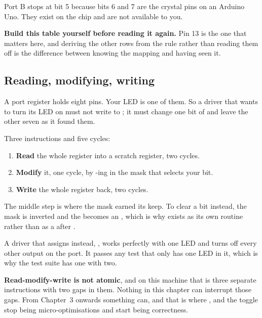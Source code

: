 Port B stops at bit 5 because bits 6 and 7 are the crystal pins on an Arduino Uno. They exist on
the chip and are not available to you.

\textbf{Build this table yourself before reading it again.} Pin 13 is the one that matters here,
and deriving the other rows from the rule rather than reading them off is the difference between
knowing the mapping and having seen it.

\subsection{Reading, modifying, writing}
\label{c2:sec:rmw}
A port register holds eight pins. Your LED is one of them. So a driver that wants to turn its LED
on must not write to ; it must change one bit of  and leave the other seven
as it found them.

Three instructions and five cycles:
\begin{enumerate}
  \item \textbf{Read} the whole register into a scratch register, two cycles.
  \item \textbf{Modify} it, one cycle, by -ing in the mask that selects your bit.
  \item \textbf{Write} the whole register back, two cycles.
\end{enumerate}

The middle step is where the mask earned its keep. To clear a bit instead, the mask is inverted and
the  becomes an , which is why  exists as its own
routine rather than as a  after .

A driver that assigns instead, , works perfectly with one LED and turns
off every other output on the port. It passes any test that only has one LED in it, which is why
the test suite has one with two.

\textbf{Read-modify-write is not atomic}, and on this machine that is three separate instructions
with two gaps in them. Nothing in this chapter can interrupt those gaps. From Chapter~3 onwards
something can, and that is where ,  and the  toggle stop being
micro-optimisations and start being correctness.
